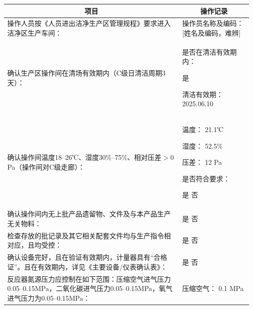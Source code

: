 \documentclass[UTF8,10pt,a4paper,fontset=fandol]{ctexart}
\newcommand{\fieldvalue}[1]{#1}
\newcommand{\handwritten}[1]{#1}
\begin{document}
\small
\begin{tabularx}{\textwidth}{|p{}|X|}
\hline
\multicolumn{1}{|c|}{项目} & \multicolumn{1}{c|}{操作记录}\\
\hline
操作人员按《人员进出洁净生产区管理规程》要求进入洁净区生产车间：
&
操作员名称及编码：
\fieldvalue{\handwritten{[姓名及编码，难辨]}}\\
\hline
确认生产区操作间在清场有效期内（C级日清洁周期3天）：
&
是否在清洁有效期内：

\fieldvalue{\handwritten{是}}

清洁有效期：
\fieldvalue{\handwritten{2025.06.10}}\\
\hline
确认操作间温度18--26℃、湿度30\%--75\%、相对压差$>0$Pa（操作间对C级走廊）：
&
温度：
\fieldvalue{\handwritten{21.1}}℃

湿度：
\fieldvalue{\handwritten{52.5}}\%

压差：
\fieldvalue{\handwritten{12}} Pa

是否符合要求：

\fieldvalue{\handwritten{是}} \quad 否\\
\hline
确认操作间内无上批产品遗留物、文件及与本产品生产无关物料：
&
\fieldvalue{\handwritten{是}} \quad 否\\
\hline
检查存放的批记录及其它相关配套文件均与生产指令相对应，且均受控：
&
\fieldvalue{\handwritten{是}} \quad 否\\
\hline
确认设备完好，且在验证有效期内，计量器具有“合格证”。且在有效期内，详见《主要设备/仪表确认表》：
&
\fieldvalue{\handwritten{是}} \quad 否\\
\hline
反应器氮源压力应控制在如下范围：压缩空气进气压力0.05--0.15MPa，二氧化碳进气压力0.05--0.15MPa，氧气进气压力为0.05--0.15MPa：
&
压缩空气：
\fieldvalue{\handwritten{0.1}} MPa


\end{tabularx}
\end{document}
